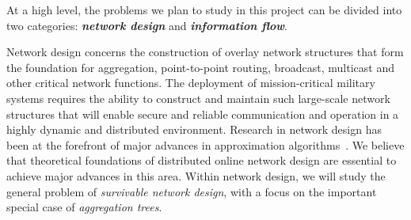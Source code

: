 At a high level, the problems we plan to study in this project can be
divided into two categories: {\bf \em network design}\/ and {\bf \em
information flow}.
\medskip

 Network design concerns the construction of
overlay network structures that form the foundation for aggregation,
point-to-point routing, broadcast, multicast and other critical
network functions.  The deployment of mission-critical military
systems requires the ability to construct and maintain such
large-scale network structures that will enable secure and reliable
communication and operation in a highly dynamic and distributed
environment.  Research in network design has been at the forefront of
major advances in approximation algorithms~\cite{SWbook}.  We believe that
theoretical foundations of distributed online network design are
essential to achieve major advances in this area.  Within network
design, we will study the general problem of {\em survivable network
design}, with a focus on the important special case of {\em
aggregation trees}.

